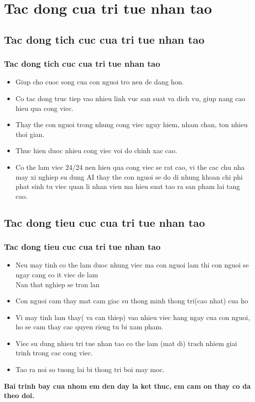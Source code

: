 \documentclass[12pt]{beamer}
\begin{document}
\section{Tac dong cua tri tue nhan tao}
\subsection{Tac dong tich cuc cua tri tue nhan tao}
\begin{frame}
\frametitle{Tac dong tich cuc cua tri tue nhan tao}
\begin{itemize}
\item Giup cho cuoc song cua con nguoi tro nen de dang hon.
\item Co tac dong truc tiep vao nhieu linh vuc san suat va dich vu, giup nang cao hieu qua cong viec.
\item Thay the con nguoi trong nhung cong viec nguy hiem, nham chan, ton nhieu thoi gian.
\item Thuc hien duoc nhieu cong viec voi do chinh xac cao.
\item Co the lam viec 24/24 nen hieu qua cong viec se rat cao, vi the cac chu nha may xi nghiep su dung AI thay the con nguoi se do di nhung khoan chi phi phat sinh tu viec quan li nhan vien ma hieu suat tao ra san pham lai tang cao.
\end{itemize}
\end{frame}
\subsection{Tac dong tieu cuc cua tri tue  nhan tao}
\begin{frame}
\frametitle{Tac dong tieu cuc cua tri tue nhan tao}	
\begin{itemize}
\item Neu may tinh co the lam duoc nhung viec ma con nguoi lam thi con nguoi se ngay cang co it viec de lam \\
Nan that nghiep se tran lan 
\item Con nguoi cam thay mat cam giac su thong minh thong tri(cao nhat) cua ho
\item Vi may tinh lam thay( va can thiep) vao nhieu viec hang ngay cua con nguoi, ho se cam thay cac quyen rieng tu bi xam pham.
\item Viec su dung nhieu tri tue nhan tao co the lam (mat di) trach nhiem giai trinh trong cac cong viec.
\item Tao ra noi so tuong lai bi thong tri boi may moc.
\end{itemize}
\end{frame}
\begin{frame}
\Huge{\textbf{Bai trinh bay cua nhom em den day la ket thuc, em cam on thay co da theo doi.}}
\end{frame}
\end{document}
